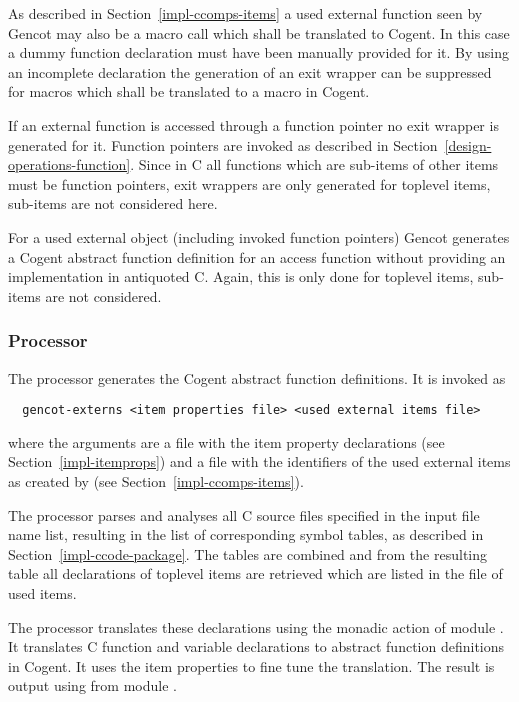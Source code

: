 As described in Section~\ref{impl-ccomps-items} a used external function seen by Gencot may also be a macro call 
which shall be translated to Cogent. In this case a dummy function declaration must have been manually provided 
for it. By using an incomplete declaration the generation of an exit wrapper can be suppressed for macros 
which shall be translated to a macro in Cogent.

If an external function is accessed through a function pointer no exit wrapper is generated for it.
Function pointers are invoked as described in Section~\ref{design-operations-function}. Since in C all functions
which are sub-items of other items must be function pointers, exit wrappers are only generated for toplevel
items, sub-items are not considered here.

For a used external object (including invoked function pointers) Gencot generates a Cogent abstract function 
definition for an access function without providing an implementation in antiquoted C. Again, this is only 
done for toplevel items, sub-items are not considered.

\subsubsection{Processor }

The processor  generates the Cogent abstract function definitions. It is invoked as
\begin{verbatim}
  gencot-externs <item properties file> <used external items file>
\end{verbatim}
where the arguments are a file with the item property declarations (see 
Section~\ref{impl-itemprops}) and a file with the identifiers of the used external items as created 
by  (see Section~\ref{impl-ccomps-items}).

The processor parses and analyses
all C source files specified in the input file name list, resulting in the list of corresponding symbol tables, as
described in Section~\ref{impl-ccode-package}. The tables are combined and from the resulting table all 
declarations of toplevel items are retrieved which are listed in the file of used items.

The processor translates these declarations using the monadic action  of
module . It translates C function and variable declarations to abstract function 
definitions in Cogent. It uses the item properties to fine tune the translation.
The result is output using  from module .


